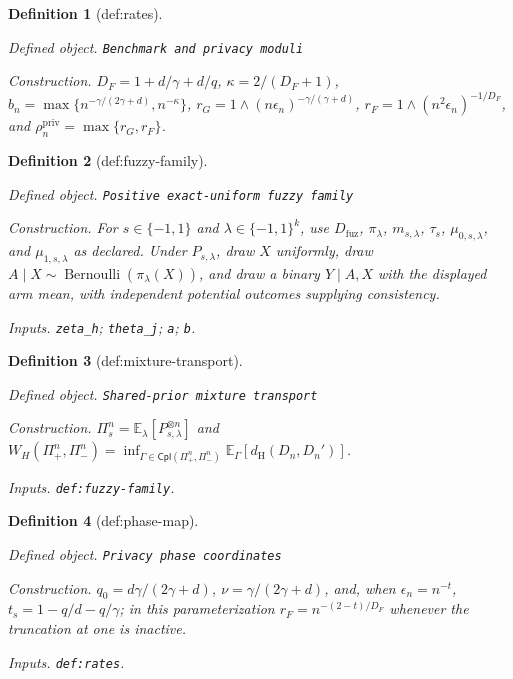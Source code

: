 \documentclass{article}
\newtheorem{definition}{Definition}
\begin{document}
\begin{definition}[def:rates]\label{def:rates}
\par\smallskip\noindent\emph{Defined object.} \texttt{Benchmark and privacy moduli}
\par\smallskip\noindent\emph{Construction.} \(D_F=1+d/\gamma+d/q\), \(\kappa=2/(D_F+1)\), \(b_n=\max\{n^{-\gamma/(2\gamma+d)},n^{-\kappa}\}\), \(r_G=1\wedge(n\epsilon_n)^{-\gamma/(\gamma+d)}\), \(r_F=1\wedge(n^2\epsilon_n)^{-1/D_F}\), and \(\rho_n^{\mathrm{priv}}=\max\{r_G,r_F\}\).
\end{definition}

\begin{definition}[def:fuzzy-family]\label{def:fuzzy-family}
\par\smallskip\noindent\emph{Defined object.} \texttt{Positive exact-\allowbreak{}uniform fuzzy family}
\par\smallskip\noindent\emph{Construction.} For \(s\in\{-1,1\}\) and \(\lambda\in\{-1,1\}^k\), use \(D_{\mathrm{fuz}}\), \(\pi_\lambda\), \(m_{s,\lambda}\), \(\tau_s\), \(\mu_{0,s,\lambda}\), and \(\mu_{1,s,\lambda}\) as declared. Under \(P_{s,\lambda}\), draw \(X\) uniformly, draw \(A\mid X\sim\operatorname{Bernoulli}(\pi_\lambda(X))\), and draw a binary \(Y\mid A,X\) with the displayed arm mean, with independent potential outcomes supplying consistency.
\par\smallskip\noindent\emph{Inputs.} \texttt{zeta\_\allowbreak{}h}; \texttt{theta\_\allowbreak{}j}; \texttt{a}; \texttt{b}.
\end{definition}

\begin{definition}[def:mixture-transport]\label{def:mixture-transport}
\par\smallskip\noindent\emph{Defined object.} \texttt{Shared-\allowbreak{}prior mixture transport}
\par\smallskip\noindent\emph{Construction.} \(\Pi_s^n=\mathbb E_\lambda[P_{s,\lambda}^{\otimes n}]\) and \(W_H(\Pi_+^n,\Pi_-^n)=\inf_{\Gamma\in\mathsf{Cpl}(\Pi_+^n,\Pi_-^n)}\mathbb E_\Gamma[d_{\mathrm H}(D_n,D_n')]\).
\par\smallskip\noindent\emph{Inputs.} \texttt{def:\allowbreak{}fuzzy-\allowbreak{}family}.
\end{definition}

\begin{definition}[def:phase-map]\label{def:phase-map}
\par\smallskip\noindent\emph{Defined object.} \texttt{Privacy phase coordinates}
\par\smallskip\noindent\emph{Construction.} \(q_0=d\gamma/(2\gamma+d)\), \(\nu=\gamma/(2\gamma+d)\), and, when \(\epsilon_n=n^{-t}\), \(t_s=1-q/d-q/\gamma\); in this parameterization \(r_F=n^{-(2-t)/D_F}\) whenever the truncation at one is inactive.
\par\smallskip\noindent\emph{Inputs.} \texttt{def:\allowbreak{}rates}.
\end{definition}
\end{document}
